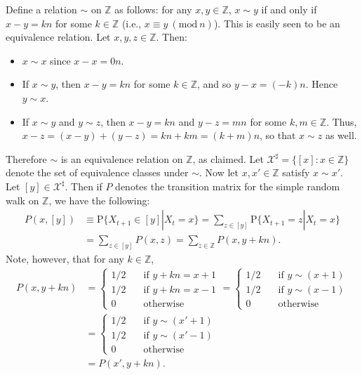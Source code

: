 \documentclass[12pt]{article}
\newcommand{\Prob}{\mathrm{P}}
\begin{document}
Define a relation $\sim$ on $\mathbb{Z}$ as follows: for any $x, y \in \mathbb{Z}$, $x \sim y$ if and only if $x - y = kn$ for some $k \in \mathbb{Z}$ (i.e., $x \equiv y\ (\mathrm{mod}\ n)$). This is easily seen to be an equivalence relation. Let $x, y, z \in \mathbb{Z}$. Then:
\begin{itemize}
\item
$x \sim x$ since $x - x = 0n$.

\item
If $x \sim y$, then $x - y = kn$ for some $k \in \mathbb{Z}$, and so $y - x = (-k)n$. Hence $y \sim x$.

\item
If $x \sim y$ and $y \sim z$, then $x - y = kn$ and $y - z = mn$ for some $k, m \in \mathbb{Z}$. Thus, $x - z = (x - y) + (y - z) = kn + km = (k+m)n$, so that $x \sim z$ as well.

\end{itemize}
Therefore $\sim$ is an equivalence relation on $\mathbb{Z}$, as claimed. Let $\mathcal{X}^\sharp = \{[x] : x \in \mathbb{Z}\}$ denote the set of equivalence classes under $\sim$. Now let $x, x' \in \mathbb{Z}$ satisfy $x \sim x'$. Let $[y] \in \mathcal{X}^\sharp$. Then if $P$ denotes the transition matrix for the simple random walk on $\mathbb{Z}$, we have the following:
\begin{align*}
P(x, [y]) &\equiv \Prob\{X_{t+1} \in [y] | X_t = x\} = \sum_{z \in [y]} \Prob\{X_{t+1} = z | X_t = x\} \\
&= \sum_{z \in [y]} P(x, z) = \sum_{z \in \mathbb{Z}} P(x, y+kn).
\end{align*}
Note, however, that for any $k \in \mathbb{Z}$,
\begin{align*}
P(x, y+kn) &= \begin{cases}
1/2 & \quad \text{if $y+kn = x+1$} \\
1/2 & \quad \text{if $y+kn = x-1$} \\
0 & \quad \text{otherwise}
\end{cases}
= \begin{cases}
1/2 & \quad \text{if $y \sim (x+1)$} \\
1/2 & \quad \text{if $y \sim (x-1)$} \\
0 & \quad \text{otherwise}
\end{cases} \\
&= \begin{cases}
1/2 & \quad \text{if $y \sim (x'+1)$} \\
1/2 & \quad \text{if $y \sim (x'-1)$} \\
0 & \quad \text{otherwise}
\end{cases} \\
&= P(x', y+kn).
\end{align*}
\end{document}
